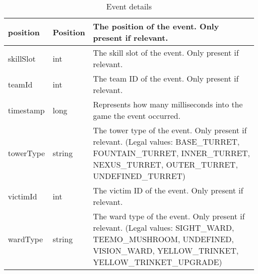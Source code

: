 \begin{table}[!htb]
\begin{tabular}{|llp{5cm}|}
position                & Position           & The position of the event. Only present if relevant.                                                                                                                                                                                        \\ \hline
skillSlot               & int                & The skill slot of the event. Only present if relevant.                                                                                                                                                                                      \\ \hline
teamId                  & int                & The team ID of the event. Only present if relevant.                                                                                                                                                                                         \\ \hline
timestamp               & long               & Represents how many milliseconds into the game the event occurred.                                                                                                                                                                          \\ \hline
towerType               & string             & The tower type of the event. Only present if relevant. (Legal values: BASE\_TURRET, FOUNTAIN\_TURRET, INNER\_TURRET, NEXUS\_TURRET, OUTER\_TURRET, UNDEFINED\_TURRET)                                                                       \\ \hline
victimId                & int                & The victim ID of the event. Only present if relevant.                                                                                                                                                                                       \\ \hline
wardType                & string             & The ward type of the event. Only present if relevant. (Legal values: SIGHT\_WARD, TEEMO\_MUSHROOM, UNDEFINED, VISION\_WARD, YELLOW\_TRINKET, YELLOW\_TRINKET\_UPGRADE)                                                                      \\ \hline
\end{tabular}
\caption{Event details}\label{tab:event}
\end{table}


\FloatBarrier
